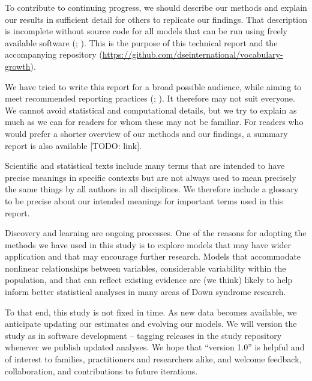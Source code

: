 \documentclass[
  11pt,
  a4paper,
]{report}
\begin{document}
To contribute to continuing progress, we should describe our methods and
explain our results in sufficient detail for others to replicate our
findings. That description is incomplete without source code for all
models that can be run using freely available software
(;
). This is the purpose of this technical report and the
accompanying repository
(\url{https://github.com/dseinternational/vocabulary-growth}).

We have tried to write this report for a broad possible audience, while
aiming to meet recommended reporting practices
(;
). It therefore may not suit everyone. We cannot avoid
statistical and computational details, but we try to explain as much as
we can for readers for whom these may not be familiar. For readers who
would prefer a shorter overview of our methods and our findings, a
summary report is also available {[}TODO: link{]}.

Scientific and statistical texts include many terms that are intended to
have precise meanings in specific contexts but are not always used to
mean precisely the same things by all authors in all disciplines. We
therefore include a glossary to be precise about our intended meanings
for important terms used in this report.

Discovery and learning are ongoing processes. One of the reasons for
adopting the methods we have used in this study is to explore models
that may have wider application and that may encourage further research.
Models that accommodate nonlinear relationships between variables,
considerable variability within the population, and that can reflect
existing evidence are (we think) likely to help inform better
statistical analyses in many areas of Down syndrome research.

To that end, this study is not fixed in time. As new data becomes
available, we anticipate updating our estimates and evolving our models.
We will version the study as in software development -- tagging releases
in the study repository whenever we publish updated analyses. We hope
that ``version 1.0'' is helpful and of interest to families,
practitioners and researchers alike, and welcome feedback,
collaboration, and contributions to future iterations.
\end{document}
